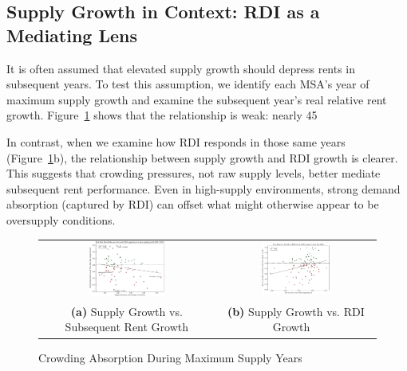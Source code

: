 \documentclass[APA,Times1COL]{WileyNJDv5} %
\begin{document}
\subsection{Supply Growth in Context: RDI as a Mediating Lens}
It is often assumed that elevated supply growth should depress rents in subsequent years. To test this assumption, we identify each MSA's year of maximum supply growth and examine the subsequent year’s real relative rent growth. Figure~\ref{fig:supply-rent} shows that the relationship is weak: nearly 45%

In contrast, when we examine how RDI responds in those same years (Figure~\ref{fig:supply-rent}b), the relationship between supply growth and RDI growth is clearer. This suggests that crowding pressures, not raw supply levels, better mediate subsequent rent performance. Even in high-supply environments, strong demand absorption (captured by RDI) can offset what might otherwise appear to be oversupply conditions.

\begin{figure}[h]
	\centering
	\begin{tabular}{cc}
		\includegraphics[width=0.45\textwidth]{max_supply_growth_vs_rent_growth.pdf} &
		\includegraphics[width=0.45\textwidth]{max_supply_vs_RDI_growth.pdf} \\
		\textbf{(a)} Supply Growth vs. Subsequent Rent Growth & \textbf{(b)} Supply Growth vs. RDI Growth \
	\end{tabular}
	\caption{Crowding Absorption During Maximum Supply Years}
	\label{fig:supply-rent}
\end{figure}
\end{document}
